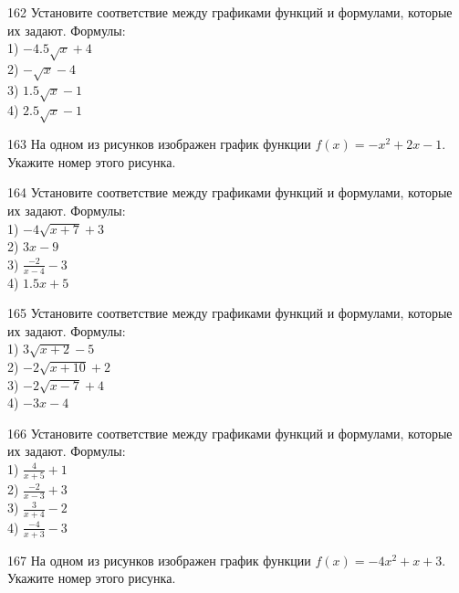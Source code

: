 \documentclass[4apaper]{article}
\begin{document}
\begin{taskBN}{162}
Установите соответствие между графиками функций и формулами, которые их задают. Формулы: \\1) $-4.5\sqrt{x}+4$\\2) $-\sqrt{x}-4$\\3) $1.5\sqrt{x}-1$\\4) $2.5\sqrt{x}-1$
\end{taskBN}

\begin{taskBN}{163}
На одном из рисунков изображен график функции $f(x)=-x^2+2x-1$. Укажите номер этого рисунка.
\end{taskBN}

\begin{taskBN}{164}
Установите соответствие между графиками функций и формулами, которые их задают. Формулы: \\1) $-4\sqrt{x+7}+3$\\2) $3x-9$\\3) $\frac{-2}{x-4}-3$\\4) $1.5x+5$
\end{taskBN}

\begin{taskBN}{165}
Установите соответствие между графиками функций и формулами, которые их задают. Формулы: \\1) $3\sqrt{x+2}-5$\\2) $-2\sqrt{x+10}+2$\\3) $-2\sqrt{x-7}+4$\\4) $-3x-4$
\end{taskBN}

\begin{taskBN}{166}
Установите соответствие между графиками функций и формулами, которые их задают. Формулы: \\1) $\frac{4}{x+5}+1$\\2) $\frac{-2}{x-3}+3$\\3) $\frac{3}{x+4}-2$\\4) $\frac{-4}{x+3}-3$
\end{taskBN}

\begin{taskBN}{167}
На одном из рисунков изображен график функции $f(x)=-4x^2+x+3$. Укажите номер этого рисунка.
\end{taskBN}
\end{document}
